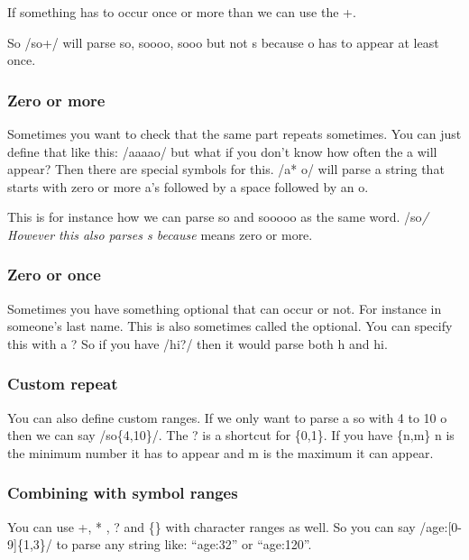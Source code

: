 \documentclass[
  11pt,
  british,
]{article}
\begin{document}
If something has to occur once or more than we can use the +.

So /so+/ will parse so, soooo, sooo but not s because o has to appear at
least once.

\hypertarget{zero-or-more}{%
\subsubsection{Zero or more}\label{zero-or-more}}

Sometimes you want to check that the same part repeats sometimes. You
can just define that like this: /aaaao/ but what if you don't know how
often the a will appear? Then there are special symbols for this. /a* o/
will parse a string that starts with zero or more a's followed by a
space followed by an o.

This is for instance how we can parse so and sooooo as the same word.
/so\emph{/ However this also parses s because } means zero or more.

\hypertarget{zero-or-once}{%
\subsubsection{Zero or once}\label{zero-or-once}}

Sometimes you have something optional that can occur or not. For
instance in someone's last name. This is also sometimes called the
optional. You can specify this with a ? So if you have /hi?/ then it
would parse both h and hi.

\hypertarget{custom-repeat}{%
\subsubsection{Custom repeat}\label{custom-repeat}}

You can also define custom ranges. If we only want to parse a so with 4
to 10 o then we can say /so\{4,10\}/. The ? is a shortcut for \{0,1\}.
If you have \{n,m\} n is the minimum number it has to appear and m is
the maximum it can appear.

\hypertarget{combining-with-symbol-ranges}{%
\subsubsection{Combining with symbol
ranges}\label{combining-with-symbol-ranges}}

You can use +, * , ? and \{\} with character ranges as well. So you can
say /age:{[}0-9{]}\{1,3\}/ to parse any string like: ``age:32'' or
``age:120''.
\end{document}
